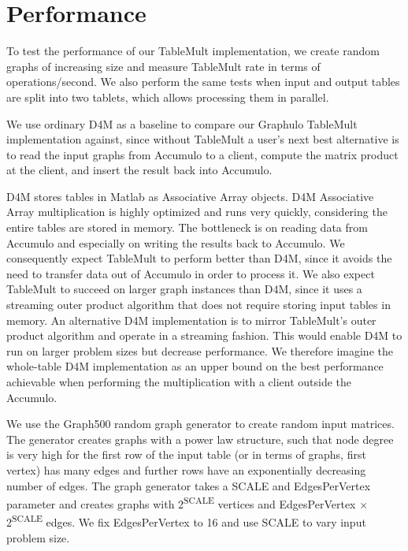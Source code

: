 
\section{Performance}
\label{sPerformance}

To test the performance of our TableMult implementation, we create random graphs of increasing size and measure
TableMult rate in terms of operations/second.  We also perform the same tests when input and output tables
are split into two tablets, which allows processing them in parallel.

We use ordinary D4M as a baseline to compare our Graphulo TableMult implementation against, since without 
TableMult a user's next best alternative is to read the input graphs from Accumulo to a client, 
compute the matrix product at the client, and insert the result back into Accumulo.

D4M stores tables in Matlab as Associative Array objects.  D4M Associative Array multiplication is highly
optimized and runs very quickly, considering the entire tables are stored in memory. The bottleneck is
on reading data from Accumulo and especially on writing the results back to Accumulo.
We consequently expect TableMult to perform better than D4M, since it avoids the need to transfer data out of Accumulo 
in order to process it. We also expect TableMult to succeed on larger graph instances than D4M, since it 
uses a streaming outer product algorithm that does not require storing input tables in memory.
An alternative D4M implementation is to mirror TableMult's outer product algorithm and operate in a
streaming fashion. This would enable D4M to run on larger problem sizes but decrease performance.
We therefore imagine the whole-table D4M implementation as an upper bound on the best performance 
achievable when performing the multiplication with a client outside the Accumulo.

We use the Graph500 random graph generator to create random input matrices. %
The generator creates graphs with a power law structure, such that node degree is very high for the 
first row of the input table (or in terms of graphs, first vertex) has many edges
and further rows have an exponentially decreasing number of edges.
The graph generator takes a SCALE and EdgesPerVertex parameter and creates graphs with 2\textsuperscript{SCALE} 
vertices and EdgesPerVertex $\times$ 2\textsuperscript{SCALE} edges.
We fix EdgesPerVertex to 16 and use SCALE to vary input problem size. 

